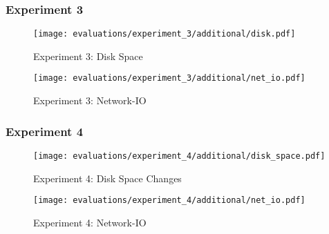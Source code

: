 \pagebreak
\subsubsection{Experiment 3}

\begin{figure}[h]
    \begin{adjustwidth}{-0.2\paperwidth}{-0.2\paperwidth}
        \centering
        \texttt{[image: evaluations/experiment\_3/additional/disk.pdf]}
        \caption{Experiment 3: Disk Space}
        \label{fig:eval_3_disk}
    \end{adjustwidth}
\end{figure}

\begin{figure}[h]
    \begin{adjustwidth}{-0.2\paperwidth}{-0.2\paperwidth}
        \centering
        \texttt{[image: evaluations/experiment\_3/additional/net\_io.pdf]}
        \caption{Experiment 3: Network-IO}
        \label{fig:eval_3_net_io}
    \end{adjustwidth}
\end{figure}

\pagebreak
\subsubsection{Experiment 4}

\begin{figure}[H]
    \begin{adjustwidth}{-0.2\paperwidth}{-0.2\paperwidth}
        \centering
        \texttt{[image: evaluations/experiment\_4/additional/disk\_space.pdf]}
        \caption{Experiment 4: Disk Space Changes}
        \label{fig:eval_4_disk}
    \end{adjustwidth}
\end{figure}

\begin{figure}[H]
    \begin{adjustwidth}{-0.2\paperwidth}{-0.2\paperwidth}
        \centering
        \texttt{[image: evaluations/experiment\_4/additional/net\_io.pdf]}
        \caption{Experiment 4: Network-IO}
        \label{fig:eval_4_net_io}
    \end{adjustwidth}
\end{figure}

